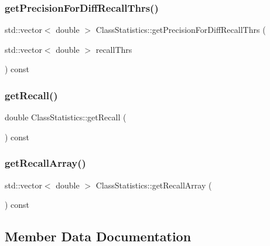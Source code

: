 \subsubsection{\texorpdfstring{get\+Precision\+For\+Diff\+Recall\+Thrs()}{getPrecisionForDiffRecallThrs()}}
{\footnotesize\ttfamily std\+::vector$<$ double $>$ Class\+Statistics\+::get\+Precision\+For\+Diff\+Recall\+Thrs (\begin{DoxyParamCaption}\item[{std\+::vector$<$ double $>$}]{recall\+Thrs }\end{DoxyParamCaption}) const}

\mbox{\label{struct_class_statistics_a4b189bb3822f02cca79dbe1b59fce7b5}} 
\subsubsection{\texorpdfstring{get\+Recall()}{getRecall()}}
{\footnotesize\ttfamily double Class\+Statistics\+::get\+Recall (\begin{DoxyParamCaption}{ }\end{DoxyParamCaption}) const}

\mbox{\label{struct_class_statistics_ae8fc780d72aca26b4dfc5af5992cb41b}} 
\subsubsection{\texorpdfstring{get\+Recall\+Array()}{getRecallArray()}}
{\footnotesize\ttfamily std\+::vector$<$ double $>$ Class\+Statistics\+::get\+Recall\+Array (\begin{DoxyParamCaption}{ }\end{DoxyParamCaption}) const}



\subsection{Member Data Documentation}
\mbox{\label{struct_class_statistics_a4f06e2d800fde06ed4f6b77547d8dc06}} 
